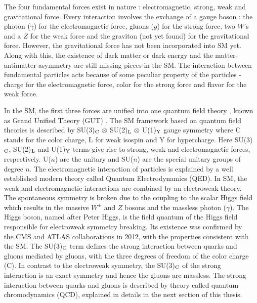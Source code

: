 The four fundamental forces exist in nature : electromagnetic, strong, weak and gravitational force. Every interaction involves the exchange of a gauge boson : the photon ($\gamma$) for the electromagnetic force, gluons ($g$) for the strong force, two $W$'s and a $Z$ for the weak force and the graviton (not yet found) for the gravitational force. However, the gravitational force has not been incorporated into SM yet. Along with this, the existence of dark matter or dark energy and the matter-antimatter asymmetry are still missing pieces in the SM. The interaction between fundamental particles acts because of some peculiar property of the particles - charge for the electromagnetic force, color for the strong force and flavor for the weak force. 

In the SM, the first three forces are unified into one quantum field theory \cite{Peskin:1995ev}, known as Grand Unified Theory (GUT) \cite{Glashow:1979pj,Salam:1980jd,Georgi:1974sy}. The SM framework based on quantum field theories is described by SU(3)$_{\rm C}~\otimes$ SU(2)$_{\rm L}~\otimes$ U(1)$_{\rm Y}$ gauge symmetry where C stands for the color charge, L for weak isospin and Y for hypercharge. Here SU(3)$_{\rm C}$, SU(2)$_{\rm L}$ and U(1)$_{\rm Y}$ terms give rise to strong, weak and electromagnetic forces, respectively. U($n$) are the unitary and SU($n$) are the special unitary groups of degree $n$. The electromagnetic interaction of particles is explained by a well established modern theory called Quantum Electrodynamics (QED). In SM, the weak and electromagnetic interactions are combined by an electroweak theory. The spontaneous symmetry is broken due to the coupling to the scalar Higgs field which results in the massive $W^{\pm}$ and $Z$ bosons and the massless photon ($\gamma$). The Higgs boson, named after Peter Higgs, is the field quantum of the Higgs field responsible for electroweak symmetry breaking. Its existence was confirmed by the CMS \cite{Chatrchyan:2012xdj} and ATLAS \cite{Aad:2012tfa} collaborations in 2012, with the properties consistent with the SM. The SU(3)$_{\rm C}$ term defines the strong interaction between quarks and gluons mediated by gluons, with the three degrees of freedom of the color charge (C). In contrast to the electroweak symmetry, the SU(3)$_{\rm C}$ of the strong interaction is an exact symmetry and hence the gluons are massless. The strong interaction between quarks and gluons is described by theory called quantum chromodynamics (QCD), explained in details in the next section of this thesis.

